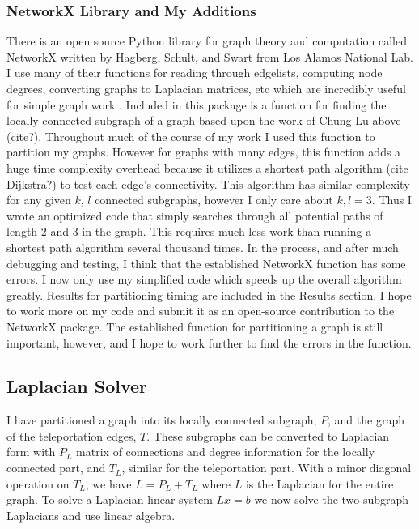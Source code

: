 \documentclass{article}
\begin{document}
\subsubsection{NetworkX Library and My Additions}
There is an open source Python library for graph theory and computation called NetworkX written by Hagberg, Schult, and Swart from Los Alamos National Lab. I use many of their functions for reading through edgelists, computing node degrees, converting graphs to Laplacian matrices, etc which are incredibly useful for simple graph work \cite{Hagberg:2008}. Included in this package is a function for finding the locally connected subgraph of a graph based upon the work of Chung-Lu above (cite?). Throughout much of the course of my work I used this function to partition my graphs. However for graphs with many edges, this function adds a huge time complexity overhead because it utilizes a shortest path algorithm (cite Dijkstra?) to test each edge's connectivity. This algorithm has similar complexity for any given $k$, $l$ connected subgraphs, however I only care about $k,l = 3$. Thus I wrote an optimized code that simply searches through all potential paths of length 2 and 3 in the graph. This requires much less work than running a shortest path algorithm several thousand times. In the process, and after much debugging and testing, I think that the established NetworkX function has some errors. I now only use my simplified code which speeds up the overall algorithm greatly. Results for partitioning timing are included in the Results section. I hope to work more on my code and submit it as an open-source contribution to the NetworkX package. The established function for partitioning a graph is still important, however, and I hope to work further to find the errors in the function.

\subsection{Laplacian Solver}
I have partitioned a graph into its locally connected subgraph, $P$, and the graph of the teleportation edges, $T$. These subgraphs can be converted to Laplacian form with $P_L$ matrix of connections and degree information for the locally connected part, and $T_L$, similar for the teleportation part. With a minor diagonal operation on $T_L$, we have $L = P_L + T_L$ where $L$ is the Laplacian for the entire graph. To solve a Laplacian linear system $Lx=b$ we now solve the two subgraph Laplacians and use linear algebra.
\end{document}
